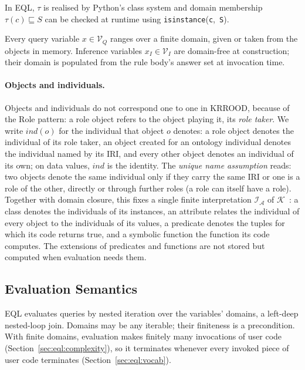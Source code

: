 \documentclass[11pt, a4paper]{article}
\theoremstyle{plain}
\theoremstyle{definition}
\theoremstyle{remark}
\begin{document}
\noindent
In EQL, $\tau$ is realised by Python's class system and domain membership $\tau(c) \sqsubseteq S$
can be checked at runtime using \texttt{isinstance}(\texttt{c},~\texttt{S}).

Every query variable $x \in \mathcal{V}_Q$ ranges over a finite domain, given or taken from
the objects in memory.  Inference variables $x_I \in \mathcal{V}_I$ are domain-free at
construction; their domain is populated from the rule body's answer set at invocation time.

\paragraph{Objects and individuals.}  Objects and individuals do not correspond one to one in
KRROOD, because of the Role pattern: a role object refers to the object playing it, its
\emph{role taker}.  We write $\mathit{ind}(o)$ for the individual that object $o$ denotes: a role object
denotes the individual of its role taker, an object created for an ontology individual denotes the
individual named by its IRI, and every other object denotes an individual of its own; on data
values, $\mathit{ind}$ is the identity.  The \emph{unique name assumption} reads: two objects denote the
same individual only if they carry the same IRI or one is a role of the other, directly or through
further roles (a role can itself have a role).  Together with domain closure, this fixes a single finite interpretation
$\mathcal{I}_{\mathcal{A}}$ of $\mathcal{K}$~\cite{abiteboul1995foundations}: a class denotes the
individuals of its instances, an attribute relates the individual of every object to the
individuals of its values, a predicate denotes the tuples for which its code returns true, and a
symbolic function the function its code computes.  The extensions of predicates and functions are
not stored but computed when evaluation needs them.

\subsection{Evaluation Semantics}
\label{sec:eql:eval}

EQL evaluates queries by nested iteration over the variables' domains, a left-deep
nested-loop join.  Domains may be any iterable; their finiteness is a precondition.  With finite
domains, evaluation makes finitely many invocations of user code
(Section~\ref{sec:eql:complexity}), so it terminates whenever every invoked piece of user code
terminates (Section~\ref{sec:eql:vocab}).
\end{document}
